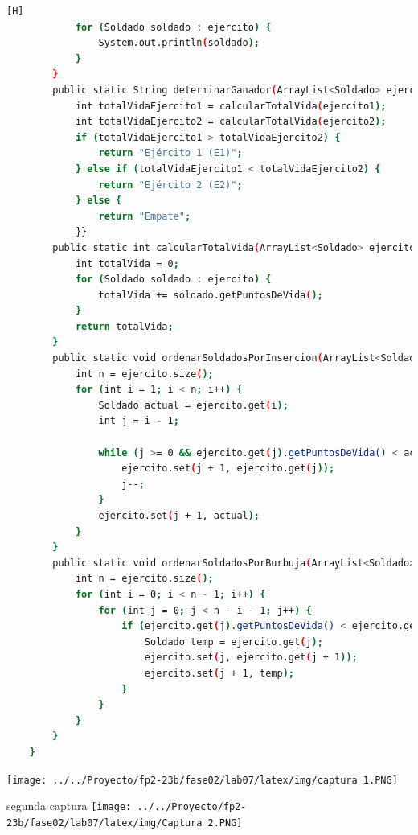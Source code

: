 \documentclass{article}
\begin{document}
\begin{lstlisting}[language=bash,caption={Creando la clase principal de VideoJuego_v4.java}][H]
	        for (Soldado soldado : ejercito) {
	            System.out.println(soldado);
	        }
	    }
	    public static String determinarGanador(ArrayList<Soldado> ejercito1, ArrayList<Soldado> ejercito2) {
	        int totalVidaEjercito1 = calcularTotalVida(ejercito1);
	        int totalVidaEjercito2 = calcularTotalVida(ejercito2);
	        if (totalVidaEjercito1 > totalVidaEjercito2) {
	            return "Ejército 1 (E1)";
	        } else if (totalVidaEjercito1 < totalVidaEjercito2) {
	            return "Ejército 2 (E2)";
	        } else {
	            return "Empate";
	        }}
	    public static int calcularTotalVida(ArrayList<Soldado> ejercito) {
	        int totalVida = 0;
	        for (Soldado soldado : ejercito) {
	            totalVida += soldado.getPuntosDeVida();
	        }
	        return totalVida;
	    }
	    public static void ordenarSoldadosPorInsercion(ArrayList<Soldado> ejercito) {
	        int n = ejercito.size();
	        for (int i = 1; i < n; i++) {
	            Soldado actual = ejercito.get(i);
	            int j = i - 1;

	            while (j >= 0 && ejercito.get(j).getPuntosDeVida() < actual.getPuntosDeVida()) {
	                ejercito.set(j + 1, ejercito.get(j));
	                j--;
	            }
	            ejercito.set(j + 1, actual);
	        }
	    }
	    public static void ordenarSoldadosPorBurbuja(ArrayList<Soldado> ejercito) {
	        int n = ejercito.size();
	        for (int i = 0; i < n - 1; i++) {
	            for (int j = 0; j < n - i - 1; j++) {
	                if (ejercito.get(j).getPuntosDeVida() < ejercito.get(j + 1).getPuntosDeVida()) {
	                    Soldado temp = ejercito.get(j);
	                    ejercito.set(j, ejercito.get(j + 1));
	                    ejercito.set(j + 1, temp);
	                }
	            }
	        }
	    }
	}
				\end{lstlisting}
\texttt{[image: ../../Proyecto/fp2-23b/fase02/lab07/latex/img/captura 1.PNG]} 

\item segunda captura
\texttt{[image: ../../Proyecto/fp2-23b/fase02/lab07/latex/img/Captura 2.PNG]} 			
		
\end{document}
